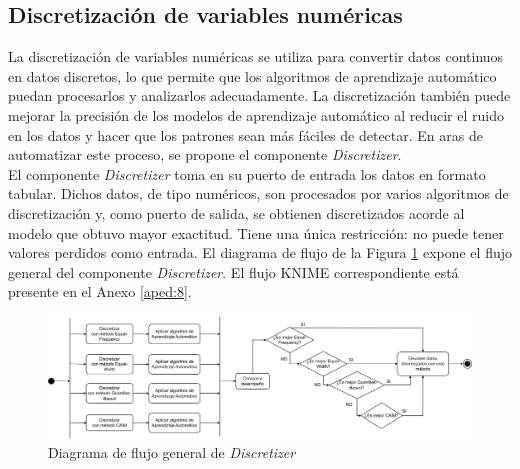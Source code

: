 \subsection{Discretización de variables numéricas} 
La discretización de variables numéricas se utiliza para convertir datos continuos en datos discretos, lo que permite que los algoritmos de aprendizaje automático puedan procesarlos y analizarlos adecuadamente. La discretización también puede mejorar la precisión de los modelos de aprendizaje automático al reducir el ruido en los datos y hacer que los patrones sean más fáciles de detectar. En aras de automatizar este proceso, se propone el componente \textit{Discretizer}. \\
El componente \textit{Discretizer} toma en su puerto de entrada los datos en formato tabular. Dichos datos, de tipo numéricos, son procesados por varios algoritmos de discretización y, como puerto de salida, se obtienen discretizados acorde al modelo que obtuvo mayor exactitud. Tiene una única restricción: no puede tener valores perdidos como entrada. El diagrama de flujo de la Figura \ref{fig:discretizacion} expone el flujo general del componente \textit{Discretizer}. El flujo KNIME correspondiente está presente en el Anexo \ref{aped:8}. 

\begin{figure}[H]
	\centering
	\includegraphics[width=1\linewidth]{"figuras/capi 2/preprocesado/discretizacion.drawio"}
	\caption{Diagrama de flujo general de \textit{Discretizer}}
	\label{fig:discretizacion}
\end{figure}

